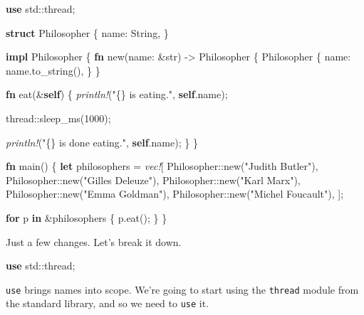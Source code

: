 \documentclass[a4paper,]{book}
\newenvironment{Shaded}{\begin{snugshade}}{\end{snugshade}}
\newcommand{\KeywordTok}[1]{\textcolor[rgb]{0.13,0.29,0.53}{\textbf{{#1}}}}
\newcommand{\DataTypeTok}[1]{\textcolor[rgb]{0.13,0.29,0.53}{{#1}}}
\newcommand{\DecValTok}[1]{\textcolor[rgb]{0.00,0.00,0.81}{{#1}}}
\newcommand{\StringTok}[1]{\textcolor[rgb]{0.31,0.60,0.02}{{#1}}}
\newcommand{\PreprocessorTok}[1]{\textcolor[rgb]{0.56,0.35,0.01}{\textit{{#1}}}}
\newcommand{\NormalTok}[1]{{#1}}
\begin{document}
\begin{Shaded}
\begin{Highlighting}[]
\KeywordTok{use} \NormalTok{std::thread;}

\KeywordTok{struct} \NormalTok{Philosopher \{}
    \NormalTok{name: }\DataTypeTok{String}\NormalTok{,}
\NormalTok{\}}

\KeywordTok{impl} \NormalTok{Philosopher \{}
    \KeywordTok{fn} \NormalTok{new(name: &}\DataTypeTok{str}\NormalTok{) -> Philosopher \{}
        \NormalTok{Philosopher \{}
            \NormalTok{name: name.to_string(),}
        \NormalTok{\}}
    \NormalTok{\}}

    \KeywordTok{fn} \NormalTok{eat(&}\KeywordTok{self}\NormalTok{) \{}
        \PreprocessorTok{println!}\NormalTok{(}\StringTok{"\{\} is eating."}\NormalTok{, }\KeywordTok{self}\NormalTok{.name);}

        \NormalTok{thread::sleep_ms(}\DecValTok{1000}\NormalTok{);}

        \PreprocessorTok{println!}\NormalTok{(}\StringTok{"\{\} is done eating."}\NormalTok{, }\KeywordTok{self}\NormalTok{.name);}
    \NormalTok{\}}
\NormalTok{\}}

\KeywordTok{fn} \NormalTok{main() \{}
    \KeywordTok{let} \NormalTok{philosophers = }\PreprocessorTok{vec!}\NormalTok{[}
        \NormalTok{Philosopher::new(}\StringTok{"Judith Butler"}\NormalTok{),}
        \NormalTok{Philosopher::new(}\StringTok{"Gilles Deleuze"}\NormalTok{),}
        \NormalTok{Philosopher::new(}\StringTok{"Karl Marx"}\NormalTok{),}
        \NormalTok{Philosopher::new(}\StringTok{"Emma Goldman"}\NormalTok{),}
        \NormalTok{Philosopher::new(}\StringTok{"Michel Foucault"}\NormalTok{),}
    \NormalTok{];}

    \KeywordTok{for} \NormalTok{p }\KeywordTok{in} \NormalTok{&philosophers \{}
        \NormalTok{p.eat();}
    \NormalTok{\}}
\NormalTok{\}}
\end{Highlighting}
\end{Shaded}

Just a few changes. Let's break it down.

\begin{Shaded}
\begin{Highlighting}[]
\KeywordTok{use} \NormalTok{std::thread;}
\end{Highlighting}
\end{Shaded}

\texttt{use} brings names into scope. We're going to start using the
\texttt{thread} module from the standard library, and so we need to
\texttt{use} it.
\end{document}
